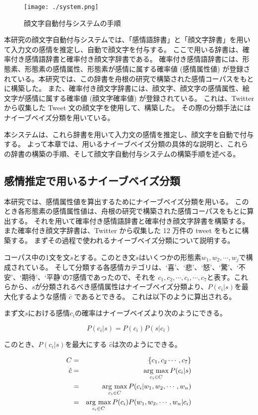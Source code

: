 \documentclass[11pt,a4j]{jsarticle}
\newcommand{\argmax}{\mathop{\rm arg~max}\limits}
\begin{document}
\begin{figure}[h]
  \texttt{[image: ./system.png]}
  \caption{顔文字自動付与システムの手順}
  \label{fig:system}
\end{figure}

本研究の顔文字自動付与システムでは、「感情語辞書」と「顔文字辞書」を用いて入力文の感情を推定し、自動で顔文字を付与する。
ここで用いる辞書は、確率付き感情語辞書と確率付き顔文字辞書である。
確率付き感情語辞書には、形態素、形態素の感情属性、形態素が感情に属する確率値 (感情属性値) が登録されている。本研究では、この辞書を舟根の研究で構築された感情コーパスをもとに構築した。
また、確率付き顔文字辞書には、顔文字、顔文字の感情属性、絵文字が感情に属する確率値 (顔文字確率値) が登録されている。
これは、Twitter から収集した Tweet 文の顔文字を使用して、構築した。
その際の分類手法にはナイーブベイズ分類を用いている。

本システムは、これら辞書を用いて入力文の感情を推定し、顔文字を自動で付与する。
よって本章では、用いるナイーブベイズ分類の具体的な説明と、これらの辞書の構築の手順、そして顔文字自動付与システムの構築手順を述べる。

  \subsection{感情推定で用いるナイーブベイズ分類}\label{sec:thesisnaivebayes}
本研究では、感情属性値を算出するためにナイーブベイズ分類を用いる。
このとき各形態素の感情属性値は、舟根の研究で構築された感情コーパスをもとに算出する。
それを用いて確率付き感情語辞書と確率付き顔文字辞書を構築する。
また確率付き顔文字辞書は、Twitter から収集した 12 万件の tweet をもとに構築する。
まずその過程で使われるナイーブベイズ分類について説明する。

コーパス中の1文を文$s$とする。このとき文$s$はいくつかの形態素$w_1,w_2, \cdots ,w_j$で構成されている。
そして分類する各感情カテゴリは、`喜'、`悲'、`怒'、`驚'、`不安'、`期待'、`平静'の7感情であったので、それを $c_1,c_2, \cdots , c_i, \cdots , c_7$と表す。これらから、$s$が分類されるべき感情属性はナイーブベイズ分類より、$P(c_i|s)$を最大化するような感情 $\hat{c}$ であるとできる。
これは以下のように算出される。

まず文$s$における感情$c_i$の確率はナイーブベイズより次のようにできる。

\[
  P(c_i|s)=P(c_i)P(s|c_i)
\]

このとき、$P(c_i|s)$を最大にする $\hat{c}$は次のようにできる。

\begin{eqnarray*}
C & = & \{c_1,c_2 \cdots ,c_7\}\\
  \hat{c} & = & \argmax_{c_i \in C} P(c_i|s) \\
          & = & \argmax_{c_i \in C} P(c_i|w_1,w_2,\cdots ,w_n) \\
          & = & \argmax_{c_i \in C} P(c_i)P(w_1,w_2,\cdots ,w_n|c_i) \\
\end{eqnarray*}
\end{document}

